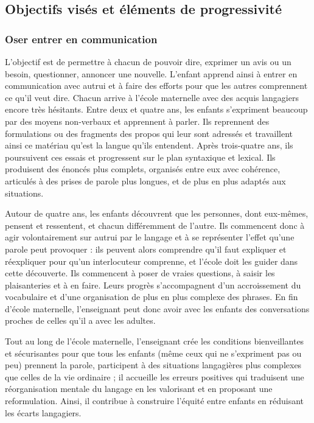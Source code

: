 \subsection{Objectifs visés et éléments de progressivité} 
\subsubsection{Oser entrer en communication}
L’objectif est de permettre à chacun de pouvoir dire, exprimer un avis ou un besoin, questionner, annoncer une nouvelle. L’enfant apprend ainsi à entrer en communication avec autrui et à faire des efforts pour que les autres comprennent ce qu’il veut dire. Chacun arrive à l’école maternelle avec des acquis langagiers encore très hésitants. Entre deux et quatre ans, les enfants s’expriment beaucoup par des moyens non-verbaux et apprennent à parler. Ils reprennent des formulations ou des fragments des propos qui leur sont adressés et travaillent ainsi ce matériau qu’est la langue qu’ils entendent. Après trois-quatre ans, ils poursuivent ces essais et progressent sur le plan syntaxique et lexical. Ils produisent des énoncés plus complets, organisés entre eux avec cohérence, articulés à des prises de parole plus longues, et de plus en plus adaptés aux situations.

Autour de quatre ans, les enfants découvrent que les personnes, dont eux-mêmes, pensent et ressentent, et chacun différemment de l’autre. Ils commencent donc à agir volontairement sur autrui par le langage et à se représenter l’effet qu’une parole peut provoquer : ils peuvent alors comprendre qu’il faut expliquer et réexpliquer pour qu’un interlocuteur comprenne, et l’école doit les guider dans cette découverte. Ils commencent à poser de vraies questions, à saisir les plaisanteries et à en faire. Leurs progrès s’accompagnent d’un accroissement du vocabulaire et d’une organisation de plus en plus complexe des phrases. En fin d’école maternelle, l’enseignant peut donc avoir avec les enfants des conversations proches de celles qu’il a avec les adultes. 

Tout au long de l’école maternelle, l’enseignant crée les conditions bienveillantes et sécurisantes pour que tous les enfants (même ceux qui ne s’expriment pas ou peu) prennent la parole, participent à des situations langagières plus complexes que celles de la vie ordinaire ; il accueille les erreurs \og positives \fg{} qui traduisent une réorganisation mentale du langage en les valorisant et en proposant une reformulation. Ainsi, il contribue à construire l’équité entre enfants en réduisant les écarts langagiers.

